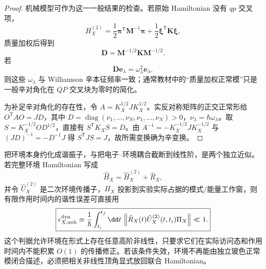\begin{proof}
机械模型可作为这一一般结果的检查。若原始 Hamiltonian 没有 $qp$ 交叉项，
\[
H_X^{(2)}
=
\frac12\boldsymbol\pi^{\mathsf T}\mathbf M^{-1}\boldsymbol\pi
+
\frac12\boldsymbol\xi^{\mathsf T}\mathbf K\boldsymbol\xi,
\]
质量加权后得到
\[
\mathbf D
=
\mathbf M^{-1/2}\mathbf K\mathbf M^{-1/2}.
\]
若
\[
\mathbf D\mathbf e_\lambda
=
\omega_\lambda^2\mathbf e_\lambda,
\]
则这些 $\omega_\lambda$ 与 Williamson 辛本征频率一致；通常教材中的“质量加权正常模”只是一般辛对角化在 $QP$ 交叉块为零时的简化。

为补足辛对角化的存在性，令 $A=K_X^{1/2}JK_X^{1/2}$。实反对称矩阵的正交正常形给 $O^{\mathsf T}AO=JD$，其中 $D=\operatorname{diag}(\nu_1,\ldots,\nu_N,\nu_1,\ldots,\nu_N)>0$，$\nu_\lambda=\hbar\omega_\lambda$。取 $S=K_X^{-1/2}OD^{1/2}$，直接有 $S^{\mathsf T}K_XS=D$。由 $A^{-1}=-K_X^{-1/2}JK_X^{-1/2}$ 与 $(JD)^{-1}=-D^{-1}J$ 得 $S^{\mathsf T}JS=J$，故所需变换确为辛变换。
\end{proof}


把环境本身约化成谐振子，与把电子--环境耦合截断到线性阶，是两个独立近似。若完整环境 Hamiltonian 写成
\[
\hat H_X
=
\hat H_X^{(2)}+\hat R_X,
\]
并令 $\hat U_X^{(2)}$ 是二次环境传播子，$\Pi_X$ 投影到实验实际占据的模式/能量工作窗，则有限作用时间内的谐性误差可直接用
\begin{equation}
\boxed{
\epsilon_{X,\rm anh}^{\rm dyn}
\equiv
\frac1\hbar
\int_{t_i}^{t_f}\dd t\,
\left\|
\hat R_X(t)
\hat U_X^{(2)}(t,t_i)\Pi_X
\right\|
\ll1 .}
\label{eq:environment_anharmonic_duhamel_control}
\end{equation}
这个判据允许环境在形式上存在任意高阶非线性，只要求它们在实际访问态和作用时间内不能积累 $O(1)$ 的传播修正。若该条件失效，环境不再能由独立玻色正常模闭合描述，必须把相关非线性顶角显式放回联合 Hamiltonian。

